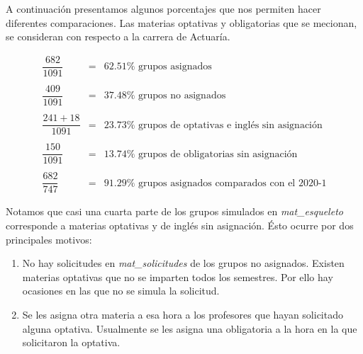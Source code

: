 A continuación presentamos algunos porcentajes que nos permiten hacer diferentes comparaciones. Las materias optativas y obligatorias que se mecionan, se consideran con respecto a la carrera de Actuaría.

\begin{eqnarray*}
\dfrac{682}{1091} &=& 62.51\% \text{ grupos asignados}\\\\
\dfrac{409}{1091} &=& 37.48\% \text{ grupos no asignados}\\\\
\dfrac{241 + 18}{1091} &=& 23.73\% \text{ grupos de optativas e inglés sin asignación}\\\\
\dfrac{150}{1091} &=& 13.74\% \text{ grupos de obligatorias sin asignación}\\\\ %
\dfrac{682}{747} &=& 91.29\% \text{ grupos asignados comparados con el 2020-1}
\end{eqnarray*}


Notamos que casi una cuarta parte de los grupos simulados en \textit{mat\_esqueleto} corresponde a materias optativas y de inglés sin asignación. Ésto ocurre por dos principales motivos:

\begin{enumerate}
\item No hay solicitudes en \textit{mat\_solicitudes} de los grupos no asignados. Existen materias optativas que no se imparten todos los semestres. Por ello hay ocasiones en las que no se simula la solicitud.

\item Se les asigna otra materia a esa hora a los profesores que hayan solicitado alguna optativa. Usualmente se les asigna una obligatoria a la hora en la que solicitaron la optativa.
\end{enumerate}

